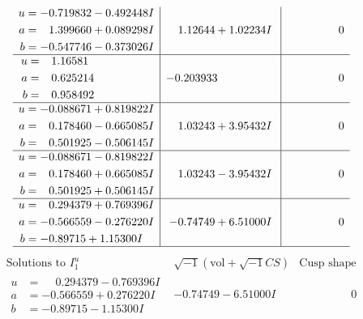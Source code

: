\documentclass[1p]{elsarticle_modified}
\theoremstyle{definition}
\newcommand{\I}{\sqrt{-1}}
\begin{document}
$$\begin{array}{c|c|c}
\begin{aligned}
u &= -0.719832 - 0.492448 I \\
a &= \phantom{-}1.399660 + 0.089298 I \\
b &= -0.547746 - 0.373026 I\end{aligned}
 & \phantom{-}1.12644 + 1.02234 I & \phantom{-0.000000 } 0 \\ \hline\begin{aligned}
u &= \phantom{-}1.16581\phantom{ +0.000000I} \\
a &= \phantom{-}0.625214\phantom{ +0.000000I} \\
b &= \phantom{-}0.958492\phantom{ +0.000000I}\end{aligned}
 & -0.203933\phantom{ +0.000000I} & \phantom{-0.000000 } 0 \\ \hline\begin{aligned}
u &= -0.088671 + 0.819822 I \\
a &= \phantom{-}0.178460 - 0.665085 I \\
b &= \phantom{-}0.501925 - 0.506145 I\end{aligned}
 & \phantom{-}1.03243 + 3.95432 I & \phantom{-0.000000 } 0 \\ \hline\begin{aligned}
u &= -0.088671 - 0.819822 I \\
a &= \phantom{-}0.178460 + 0.665085 I \\
b &= \phantom{-}0.501925 + 0.506145 I\end{aligned}
 & \phantom{-}1.03243 - 3.95432 I & \phantom{-0.000000 } 0 \\ \hline\begin{aligned}
u &= \phantom{-}0.294379 + 0.769396 I \\
a &= -0.566559 - 0.276220 I \\
b &= -0.89715 + 1.15300 I\end{aligned}
 & -0.74749 + 6.51000 I & \phantom{-0.000000 } 0\\
 \hline 
 \end{array}$$\newpage$$\begin{array}{c|c|c}  
\text{Solutions to }I^u_{1}& \I (\text{vol} + \sqrt{-1}CS) & \text{Cusp shape}\\
 \hline 
\begin{aligned}
u &= \phantom{-}0.294379 - 0.769396 I \\
a &= -0.566559 + 0.276220 I \\
b &= -0.89715 - 1.15300 I\end{aligned}
 & -0.74749 - 6.51000 I & \phantom{-0.000000 } 0 \\ \hline\begin{aligned}

\end{aligned}
\end{array}$$
\end{document}
